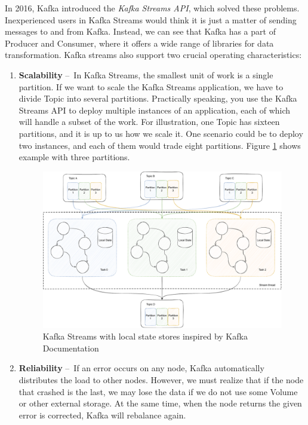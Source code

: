 In 2016, Kafka introduced the \emph{Kafka Streams API}, which solved these problems.
Inexperienced users in Kafka Streams would think it is just a matter of sending messages to and from Kafka.
Instead, we can see that Kafka has a part of Producer and Consumer, where it offers a wide range of libraries for data transformation.
Kafka streams also support two crucial operating characteristics:
\begin{enumerate}[itemsep=1mm, parsep=0pt]
    \item \textbf{Scalability} \---\ In Kafka Streams, the smallest unit of work is a single partition.
    If we want to scale the Kafka Streams application, we have to divide Topic into several partitions.
    Practically speaking, you use the Kafka Streams API to deploy multiple instances of an application, each of which will handle a subset of the work.
    For illustration, one Topic has sixteen partitions, and it is up to us how we scale it.
    One scenario could be to deploy two instances, and each of them would trade eight partitions.
    Figure \ref{fig:kafkaStreams} shows example with three partitions.
    
    \begin{figure}[!h]
    \centering
    \includegraphics[scale=0.48]{obrazky-figures/02-preliminaries/02-kafka/07-kafka-streams-with-localstate,thread.pdf}
    \caption{Kafka Streams with local state stores inspired by Kafka Documentation~\cite{kafkaDocumentation}}
    \label{fig:kafkaStreams}
    \end{figure}
    
    
    \item \textbf{Reliability} \---\ If an error occurs on any node, Kafka automatically distributes the load to other nodes.
    However, we must realize that if the node that crashed is the last, we may lose the data if we do not use some Volume or other external storage.
    At the same time, when the node returns the given error is corrected, Kafka will rebalance again.
\end{enumerate}


